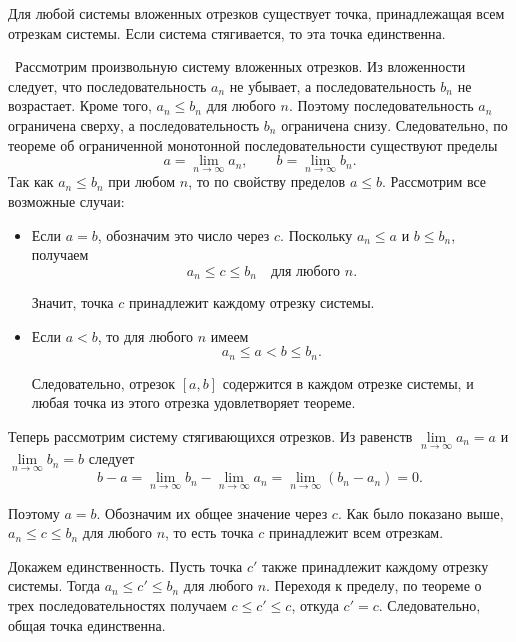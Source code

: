 \begin{theorem}
Для любой системы вложенных отрезков существует точка, принадлежащая всем отрезкам системы.
Если система стягивается, то эта точка единственна.

\vspace{2mm}

\proofname~Рассмотрим произвольную систему вложенных отрезков.
Из вложенности следует, что последовательность \(a_{n}\) не убывает,
а последовательность \(b_{n}\) не возрастает. Кроме того,
\(a_{n}\leq b_{n}\) для любого \(n\). Поэтому последовательность
\(a_{n}\) ограничена сверху, а последовательность \(b_{n}\) ограничена
снизу. Следовательно, по теореме об ограниченной монотонной
последовательности существуют пределы
\[
a = \lim_{n \to \infty} a_{n}, \qquad b = \lim_{n \to \infty} b_{n}.
\]
Так как \(a_{n}\leq b_{n}\) при любом \(n\), то по свойству пределов \(a\leq b\).
Рассмотрим все возможные случаи:

\begin{itemize}
\item Если \(a=b\), обозначим это число через \(c\). Поскольку
\(a_{n}\leq a\) и \(b\leq b_{n}\), получаем
\[
a_{n} \leq c \leq b_{n} \quad \text{для любого } n.
\]

Значит, точка \(c\) принадлежит каждому отрезку системы.

\item Если \(a<b\), то для любого \(n\) имеем
\[
a_{n} \leq a < b \leq b_{n}.
\]

Следовательно, отрезок \([a,b]\) содержится в каждом отрезке
системы, и любая точка из этого отрезка удовлетворяет теореме.
\end{itemize}

Теперь рассмотрим систему стягивающихся отрезков. Из равенств
\(\underset{n \to \infty}{\lim} a_{n} = a\) и
\(\underset{n \to \infty}{\lim} b_{n} = b\) следует
\[
b - a = \lim_{ n \to \infty } b_{n} - \lim_{ n \to \infty } a_{n} =
\lim_{n \to \infty}(b_{n} - a_{n}) = 0.
\]

Поэтому \(a = b\). Обозначим их общее значение через \(c\). Как было
показано выше, \(a_{n} \leq c \leq b_{n}\) для любого \(n\), то есть
точка \(c\) принадлежит всем отрезкам.

Докажем единственность. Пусть точка \(c'\) также принадлежит каждому
отрезку системы. Тогда \(a_{n} \leq c' \leq b_{n}\) для любого \(n\).
Переходя к пределу, по теореме о трех последовательностях
получаем \(c \leq c' \leq c\), откуда \(c' = c\).
Следовательно, общая точка единственна.~\qedsymbol
\end{theorem}
